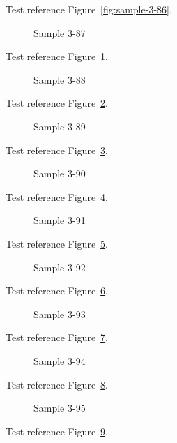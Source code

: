 Test reference Figure~\ref{fig:sample-3-86}.

\begin{figure}[tbhp]
\caption{Sample 3-87}
\label{fig:sample-3-87}
\end{figure}

Test reference Figure~\ref{fig:sample-3-87}.

\begin{figure}[tbhp]
\caption{Sample 3-88}
\label{fig:sample-3-88}
\end{figure}

Test reference Figure~\ref{fig:sample-3-88}.

\begin{figure}[tbhp]
\caption{Sample 3-89}
\label{fig:sample-3-89}
\end{figure}

Test reference Figure~\ref{fig:sample-3-89}.

\begin{figure}[tbhp]
\caption{Sample 3-90}
\label{fig:sample-3-90}
\end{figure}

Test reference Figure~\ref{fig:sample-3-90}.

\begin{figure}[tbhp]
\caption{Sample 3-91}
\label{fig:sample-3-91}
\end{figure}

Test reference Figure~\ref{fig:sample-3-91}.

\begin{figure}[tbhp]
\caption{Sample 3-92}
\label{fig:sample-3-92}
\end{figure}

Test reference Figure~\ref{fig:sample-3-92}.

\begin{figure}[tbhp]
\caption{Sample 3-93}
\label{fig:sample-3-93}
\end{figure}

Test reference Figure~\ref{fig:sample-3-93}.

\begin{figure}[tbhp]
\caption{Sample 3-94}
\label{fig:sample-3-94}
\end{figure}

Test reference Figure~\ref{fig:sample-3-94}.

\begin{figure}[tbhp]
\caption{Sample 3-95}
\label{fig:sample-3-95}
\end{figure}

Test reference Figure~\ref{fig:sample-3-95}.


